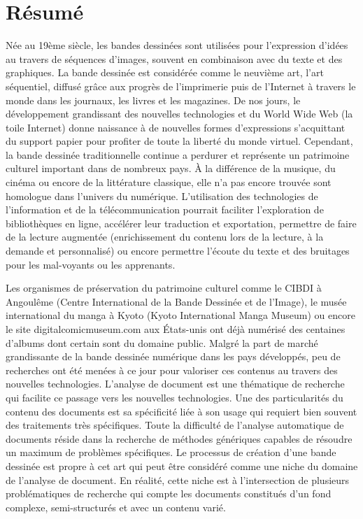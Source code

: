 \chapter*{R{\'e}sum{\'e}}

Née au 19ème siècle, les bandes dessinées sont utilisées pour l'expression d'idées au travers de séquences d'images, souvent en combinaison avec du texte et des graphiques.
La bande dessinée est considérée comme le neuvième art, l'art séquentiel, diffusé grâce aux progrès de l'imprimerie puis de l'Internet à travers le monde dans les journaux, les livres et les magazines.
De nos jours, le développement grandissant des nouvelles technologies et du World Wide Web (la toile Internet) donne naissance à de nouvelles formes d'expressions s'acquittant du support papier pour profiter de toute la liberté du monde virtuel.
Cependant, la bande dessinée traditionnelle continue a perdurer et représente un patrimoine culturel important dans de nombreux pays.
À la différence de la musique, du cinéma ou encore de la littérature classique, elle n'a pas encore trouvée sont homologue dans l'univers du numérique.
L'utilisation des technologies de l'information et de la télécommunication pourrait faciliter l'exploration de bibliothèques en ligne, accélérer leur traduction et exportation, permettre de faire de la lecture augmentée (enrichissement du contenu lors de la lecture, à la demande et personnalisé) ou encore permettre l'écoute du texte et des bruitages pour les mal-voyants ou les apprenants.

Les organismes de préservation du patrimoine culturel comme le CIBDI à Angoulême (Centre International de la Bande Dessinée et de l'Image), le musée international du manga à Kyoto (Kyoto International Manga Museum) ou encore le site digitalcomicmuseum.com aux États-unis ont déjà numérisé des centaines d'albums dont certain sont du domaine public.
Malgré la part de marché grandissante de la bande dessinée numérique dans les pays développés, peu de recherches ont été menées à ce jour pour valoriser ces contenus au travers des nouvelles technologies.
L'analyse de document est une thématique de recherche qui facilite ce passage vers les nouvelles technologies.
Une des particularités du contenu des documents est sa spécificité liée à son usage qui requiert bien souvent des traitements très spécifiques.
Toute la difficulté de l'analyse automatique de documents réside dans la recherche de méthodes génériques capables de résoudre un maximum de problèmes spécifiques.
Le processus de création d'une bande dessinée est propre à cet art qui peut être considéré comme une niche du domaine de l'analyse de document.
En réalité, cette niche est à l'intersection de plusieurs problématiques de recherche qui compte les documents constitués d'un fond complexe, semi-structurés et avec un contenu varié.

